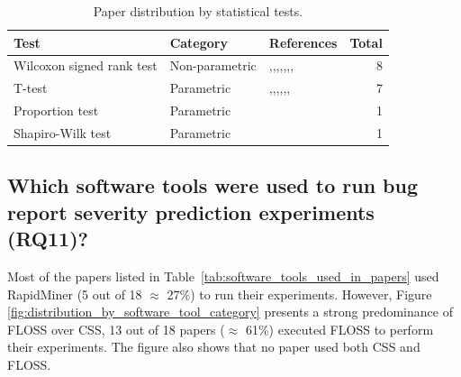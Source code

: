 \begin{table}[h!]
  \centering
  \captionsetup{type=table}
  \caption{Paper distribution by statistical tests.}
  \begin{tabular}{@{}llp{6cm}r@{}}
    \toprule
    \textbf{Test} & \textbf{Category} & \textbf{References} & \textbf{Total} \\
    \midrule
    Wilcoxon signed rank test & Non-parametric & \cite{Yang:2014b},\cite{Valdivia:2014},\cite{Zhang:2015},\cite{Xia:2015},\cite{Zhang:2016},\cite{Jin:2016b},\cite{Yang:2017},\cite{Singh:2017} & 8 \\
    \midrule
    T-test & Parametric & \cite{Yang:2014b},\cite{Zhang:2015},\cite{Zhang:2016},\cite{Choeikiwong:2016},\cite{Jin:2016b},\cite{Yang:2017},\cite{Roy:2017} & 7 \\
    \midrule
    Proportion test & Parametric & \cite{Roy:2017} & 1 \\
    \midrule
    Shapiro-Wilk test & Parametric & \cite{Yang:2017} & 1 \\
    \bottomrule
  \end{tabular} 
  \label{tab:statistical_test_type_by_papers}
\end{table}

\subsection{Which software tools were used to run bug report severity prediction experiments (RQ11)?}\label{subsec:rq11} 

Most of the papers listed in Table~\ref{tab:software_tools_used_in_papers} used RapidMiner (5 out of 18 $\approx$ 27\%) to run their experiments. However, Figure \ref{fig:distribution_by_software_tool_category} presents a strong predominance of FLOSS over CSS, 13 out of 18  papers ($\approx$ 61\%) executed  FLOSS to perform their experiments. The figure also shows that no paper used both CSS and FLOSS.

